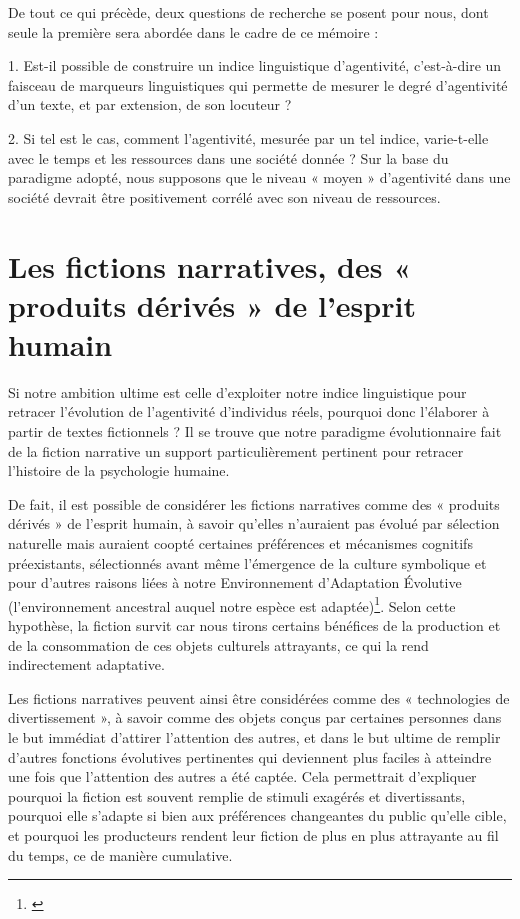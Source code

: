 De tout ce qui précède, deux questions de recherche se posent pour nous, dont seule la première sera abordée dans le cadre de ce mémoire : 

1. Est-il possible de construire un indice linguistique d'agentivité, c'est-à-dire un faisceau de marqueurs linguistiques qui permette de mesurer le degré d'agentivité d'un texte, et par extension, de son locuteur ?

2. Si tel est le cas, comment l’agentivité, mesurée par un tel indice, varie-t-elle avec le temps et les ressources dans une société donnée ? Sur la base du paradigme adopté, nous supposons que le niveau « moyen » d’agentivité dans une société devrait être positivement corrélé avec son niveau de ressources.

\section{Les fictions narratives, des « produits dérivés » de l’esprit humain}

Si notre ambition ultime est celle d’exploiter notre indice linguistique pour retracer l’évolution de l’agentivité d’individus réels, pourquoi donc l’élaborer à partir de textes fictionnels ? Il se trouve que notre paradigme évolutionnaire fait de la fiction narrative un support particulièrement pertinent pour retracer l'histoire de la psychologie humaine. 

De fait, il est possible de considérer les fictions narratives comme des « produits dérivés » de l'esprit humain, à savoir qu'elles n'auraient pas évolué par sélection naturelle mais auraient coopté certaines préférences et mécanismes cognitifs préexistants, sélectionnés avant même l'émergence de la culture symbolique et pour d'autres raisons liées à notre Environnement d'Adaptation Évolutive (l'environnement ancestral auquel notre espèce est adaptée)\footnote{\cite{dubourg_why_2022}}. Selon cette hypothèse, la fiction survit car nous tirons certains bénéfices de la production et de la consommation de ces objets culturels attrayants, ce qui la rend indirectement adaptative.

Les fictions narratives peuvent ainsi être considérées comme des « technologies de divertissement », à savoir comme des objets conçus par certaines personnes dans le but immédiat d'attirer l'attention des autres, et dans le but ultime de remplir d'autres fonctions évolutives pertinentes qui deviennent plus faciles à atteindre une fois que l'attention des autres a été captée. Cela permettrait d'expliquer pourquoi la fiction est souvent remplie de stimuli exagérés et divertissants, pourquoi elle s'adapte si bien aux préférences changeantes du public qu'elle cible, et pourquoi les producteurs rendent leur fiction de plus en plus attrayante au fil du temps, ce de manière cumulative.

